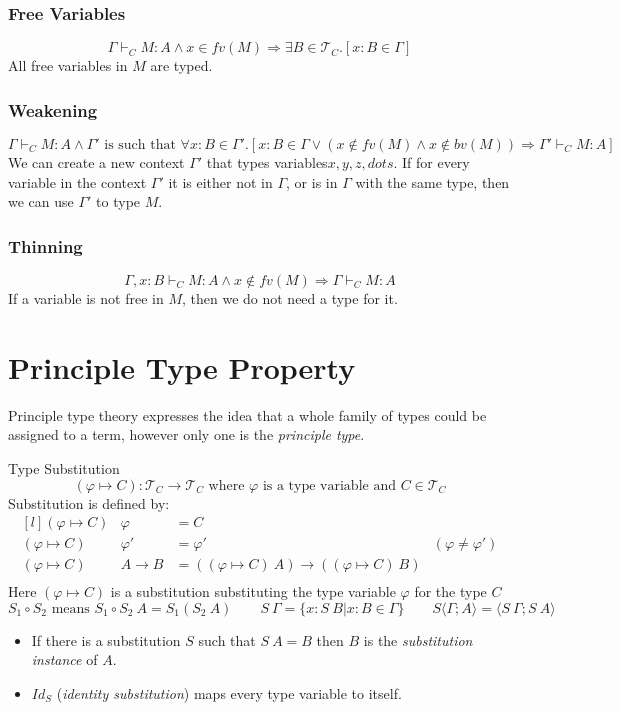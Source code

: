 \subsubsection{Free Variables}
\[\Gamma \vdash_C M : A \land x \in fv(M) \Rightarrow \exists B \in \mathcal{T}_C . [x : B \in \Gamma]\]
All free variables in $M$ are typed.
\subsubsection{Weakening}
\[\Gamma \vdash_C M : A \land \Gamma' \text{ is such that } \forall x: B \in \Gamma' . [x:B \in \Gamma \lor (x \not\in fv(M) \land x \not\in bv(M)) \Rightarrow \Gamma' \vdash_C M : A]\]
We can create a new context $\Gamma'$ that types variables$x,y,z, dots$. If for every variable in the context $\Gamma'$ it is either not in $\Gamma$, or is in $\Gamma$  with the same type, then we can use $\Gamma'$ to type $M$.

\subsubsection{Thinning}
\[\Gamma, x:B \vdash_C M : A \land x \not\in fv(M) \Rightarrow \Gamma \vdash_C M : A\]
If a variable is not free in $M$, then we do not need a type for it.

\section{Principle Type Property}
Principle type theory expresses the idea that a whole family of types could be assigned to a term, however only one is the \textit{principle type}.
\begin{definitionbox}{Type Substitution}
    \[(\varphi \mapsto C) : \mathcal{T}_C \to \mathcal{T}_C \text{ where } \varphi \text{ is a type variable and } C \in \mathcal{T}_C\]
    Substitution is defined by:
    \[\begin{matrix*}[l]
        (\varphi \mapsto C) & \varphi & = C \\
        (\varphi \mapsto C) & \varphi' & = \varphi' & (\varphi \neq \varphi') \\
        (\varphi \mapsto C) & A \to B &= ((\varphi \mapsto C) \ A) \to ((\varphi \mapsto C) \ B) \\
    \end{matrix*}\]
    Here $(\varphi \mapsto C)$ is a substitution substituting the type variable $\varphi$ for the type $C$
    \[S_1 \circ S_2 \text{ means } S_1 \circ S_2 \ A = S_1 (S_2 \ A) \qquad S \ \Gamma = \{x: S \ B | x:B \in \Gamma\} \qquad S \langle \Gamma ; A \rangle = \langle S \ \Gamma ; S \ A \rangle\]
    \begin{itemize}
        \item If there is a substitution $S$ such that $S \ A = B$ then $B$ is the \textit{substitution instance} of $A$.
        \item $Id_S$ (\textit{identity substitution}) maps every type variable to itself.
    \end{itemize}
\end{definitionbox}

